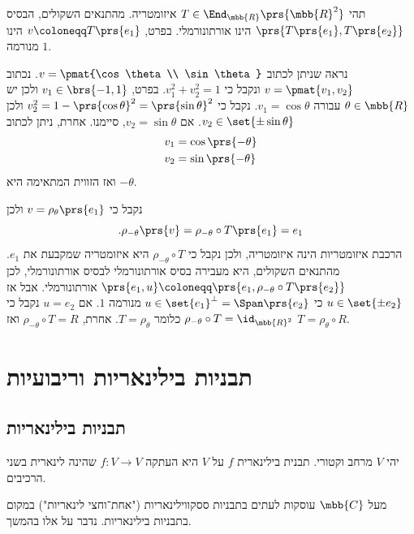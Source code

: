 \documentclass[a4paper,10pt,twoside,openany]{book}
\begin{document}
\begin{solution}
תהי
$T \in \End_{\mbb{R}}\prs{\mbb{R}^2}$
איזומטריה.
מהתנאים השקולים, הבסיס
$\prs{T\prs{e_1}, T\prs{e_2}}$
הינו אורתונורמלי.
בפרט,
$v \coloneqq T\prs{e_1}$
הינו מנורמה
$1$.

נראה שניתן לכתוב
$v = \pmat{\cos\theta \\ \sin\theta}$.
נכתוב
$v = \pmat{v_1, v_2}$
ונקבל כי
$v_1^2 + v_2^2 = 1$.
בפרט,
$v_1 \in \brs{-1,1}$
ולכן יש
$\theta \in \mbb{R}$
עבורה
$v_1 = \cos\theta$.
נקבל כי
$v_2^2 = 1 - \prs{\cos \theta}^2 = \prs{\sin \theta}^2$
ולכן
$v_2 \in \set{\pm \sin \theta}$.
אם
$v_2 = \sin\theta$,
סיימנו.
אחרת, ניתן לכתוב
\begin{align*}
    v_1 &= \cos\prs{-\theta} \\
    v_2 &= \sin\prs{-\theta}
\end{align*}
ואז הזווית המתאימה היא
$-\theta$.

נקבל כי
$v = \rho_\theta\prs{e_1}$
ולכן
\[\text{.} \rho_{-\theta}\prs{v} = \rho_{-\theta} \circ T \prs{e_1} = e_1\]
הרכבת איזומטריות הינה איזומטריה, ולכן נקבל כי
$\rho_{-\theta} \circ T$
היא איזומטריה שמקבעת את
$e_1$.
מהתנאים השקולים, היא מעבירה בסיס אורתונורמלי לבסיס אורתונורמלי, לכן
$\prs{e_1, u} \coloneqq \prs{e_1, \rho_{-\theta} \circ T\prs{e_2}}$
אורתונורמלי.
אבל אז
$u \in \set{\pm e_2}$
כי
$u \in \set{e_1}^\perp = \Span\prs{e_2}$
מנורמה
$1$.
אם
$u = e_2$
נקבל כי
$\rho_{-\theta} \circ T = \id_{\mbb{R}^2}$
כלומר
$T = \rho_{\theta}$.
אחרת,
$\rho_{-\theta} \circ T = R$
ואז
$T = \rho_{\theta} \circ R$.
\end{solution}

\chapter{תבניות בילינאריות וריבועיות}

\section{תבניות בילינאריות}

\begin{definition}
יהי
$V$
מרחב וקטורי. תבנית בילינארית
$f$
על
$V$
היא העתקה
$f \colon V \to V$
שהינה לינארית בשני הרכיבים.
\end{definition}

\begin{remark}
מעל
$\mbb{C}$
עוסקות לעתים בתבניות ססקווילינאריות ("אחת־וחצי לינאריות") במקום בתבניות בילינאריות. נדבר על אלו בהמשך.
\end{remark}
\end{document}
